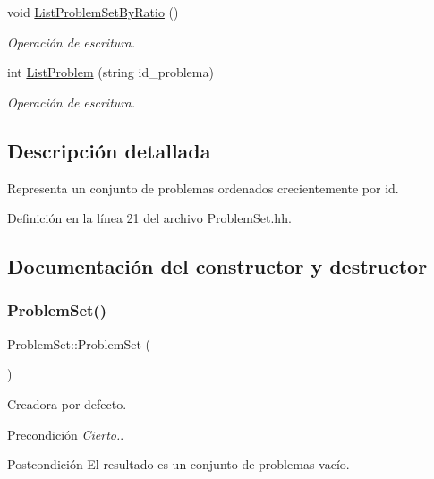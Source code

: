 \begin{DoxyCompactItemize}
void \mbox{\hyperlink{class_problem_set_ab45006ff08ba3c36bc3c08a427391b69}{List\+Problem\+Set\+By\+Ratio}} ()
\begin{DoxyCompactList}\small\item\em Operación de escritura. \end{DoxyCompactList}\item 
int \mbox{\hyperlink{class_problem_set_a7ef02642813914f7ca93c93835ddcda3}{List\+Problem}} (string id\+\_\+problema)
\begin{DoxyCompactList}\small\item\em Operación de escritura. \end{DoxyCompactList}\end{DoxyCompactItemize}


\subsection{Descripción detallada}
Representa un conjunto de problemas ordenados crecientemente por id. 

Definición en la línea 21 del archivo Problem\+Set.\+hh.



\subsection{Documentación del constructor y destructor}
\mbox{\label{class_problem_set_a3eadb6c62386acf9948b95bb6d05b5ae}} 
\subsubsection{\texorpdfstring{Problem\+Set()}{ProblemSet()}}
{\footnotesize\ttfamily Problem\+Set\+::\+Problem\+Set (\begin{DoxyParamCaption}{ }\end{DoxyParamCaption})}



Creadora por defecto. 

\begin{DoxyPrecond}{Precondición}
{\itshape Cierto.}. 
\end{DoxyPrecond}
\begin{DoxyPostcond}{Postcondición}
El resultado es un conjunto de problemas vacío. 
\end{DoxyPostcond}


